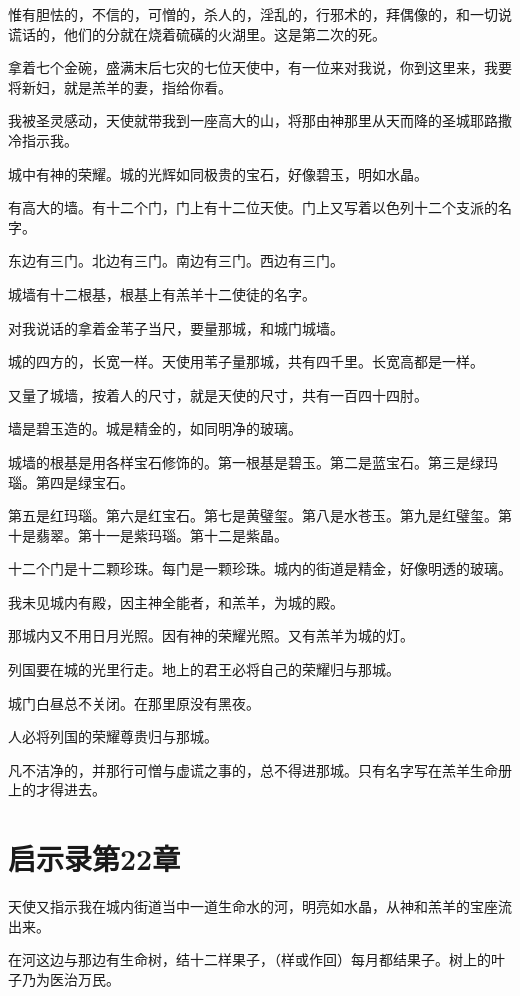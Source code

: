 \documentclass[12pt,oneside]{book}
\begin{document}
惟有胆怯的，不信的，可憎的，杀人的，淫乱的，行邪术的，拜偶像的，和一切说谎话的，他们的分就在烧着硫磺的火湖里。这是第二次的死。

拿着七个金碗，盛满末后七灾的七位天使中，有一位来对我说，你到这里来，我要将新妇，就是羔羊的妻，指给你看。

我被圣灵感动，天使就带我到一座高大的山，将那由神那里从天而降的圣城耶路撒冷指示我。

城中有神的荣耀。城的光辉如同极贵的宝石，好像碧玉，明如水晶。

有高大的墙。有十二个门，门上有十二位天使。门上又写着以色列十二个支派的名字。

东边有三门。北边有三门。南边有三门。西边有三门。

城墙有十二根基，根基上有羔羊十二使徒的名字。

对我说话的拿着金苇子当尺，要量那城，和城门城墙。

城的四方的，长宽一样。天使用苇子量那城，共有四千里。长宽高都是一样。

又量了城墙，按着人的尺寸，就是天使的尺寸，共有一百四十四肘。

墙是碧玉造的。城是精金的，如同明净的玻璃。

城墙的根基是用各样宝石修饰的。第一根基是碧玉。第二是蓝宝石。第三是绿玛瑙。第四是绿宝石。

第五是红玛瑙。第六是红宝石。第七是黄璧玺。第八是水苍玉。第九是红璧玺。第十是翡翠。第十一是紫玛瑙。第十二是紫晶。

十二个门是十二颗珍珠。每门是一颗珍珠。城内的街道是精金，好像明透的玻璃。

我未见城内有殿，因主神全能者，和羔羊，为城的殿。

那城内又不用日月光照。因有神的荣耀光照。又有羔羊为城的灯。

列国要在城的光里行走。地上的君王必将自己的荣耀归与那城。

城门白昼总不关闭。在那里原没有黑夜。

人必将列国的荣耀尊贵归与那城。

凡不洁净的，并那行可憎与虚谎之事的，总不得进那城。只有名字写在羔羊生命册上的才得进去。

\chapter{启示录第22章}
天使又指示我在城内街道当中一道生命水的河，明亮如水晶，从神和羔羊的宝座流出来。

在河这边与那边有生命树，结十二样果子，（样或作回）每月都结果子。树上的叶子乃为医治万民。
\end{document}
